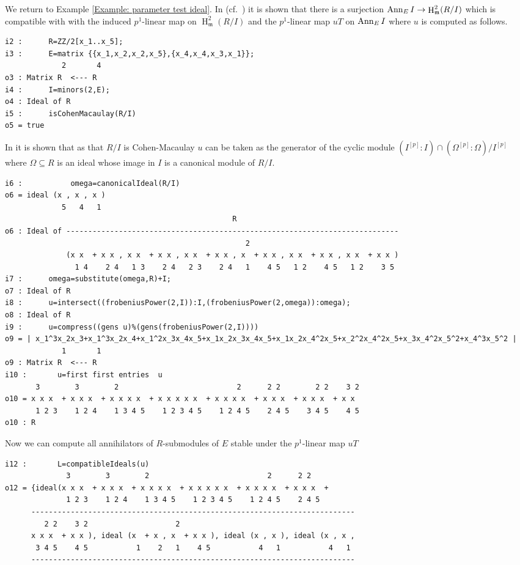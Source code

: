 \documentclass[11pt]{amsart}
\DeclareMathOperator{\HH}{H}
\begin{document}
\begin{example}
 
We return to Example \ref{Example: parameter test ideal}.
In (cf.~\cite[\S 9]{KatzmanParameterTestIdealOfCMRings}) it is shown that
there is a surjection $\Ann_E I \rightarrow \HH^2_{\mathfrak{m}} (R/I)$
which is compatible with with the induced $p^1$-linear map on $\HH^2_{\mathfrak{m}} (R/I)$
and the $p^1$-linear map $u T$ on $\operatorname{{Ann}}_E I$ where $u$ is computed as follows.
\begin{verbatim}
i2 :      R=ZZ/2[x_1..x_5]; 
i3 :      E=matrix {{x_1,x_2,x_2,x_5},{x_4,x_4,x_3,x_1}};
             2       4
o3 : Matrix R  <--- R
i4 :      I=minors(2,E);
o4 : Ideal of R
i5 :      isCohenMacaulay(R/I)
o5 = true
\end{verbatim}

In \cite{KatzmanParameterTestIdealOfCMRings} it is shown that as that $R/I$ is Cohen-Macaulay $u$
can be taken as the generator of the cyclic module $(I^{[p]}:I) \cap (\Omega^{[p]}:\Omega)/I^{[p]}$
where $\Omega \subseteq R$ is an ideal whose image in $I$ is a canonical module of $R/I$.


\begin{verbatim}
i6 :           omega=canonicalIdeal(R/I)
o6 = ideal (x , x , x )
             5   4   1
                                                    R
o6 : Ideal of ----------------------------------------------------------------------------
                                                       2
              (x x  + x x , x x  + x x , x x  + x x , x  + x x , x x  + x x , x x  + x x )
                1 4    2 4   1 3    2 4   2 3    2 4   1    4 5   1 2    4 5   1 2    3 5
i7 :      omega=substitute(omega,R)+I;
o7 : Ideal of R
i8 :      u=intersect((frobeniusPower(2,I)):I,(frobeniusPower(2,omega)):omega);
o8 : Ideal of R
i9 :      u=compress((gens u)%(gens(frobeniusPower(2,I))))
o9 = | x_1^3x_2x_3+x_1^3x_2x_4+x_1^2x_3x_4x_5+x_1x_2x_3x_4x_5+x_1x_2x_4^2x_5+x_2^2x_4^2x_5+x_3x_4^2x_5^2+x_4^3x_5^2 |
             1       1
o9 : Matrix R  <--- R
i10 :       u=first first entries  u
       3        3        2                           2      2 2        2 2    3 2
o10 = x x x  + x x x  + x x x x  + x x x x x  + x x x x  + x x x  + x x x  + x x
       1 2 3    1 2 4    1 3 4 5    1 2 3 4 5    1 2 4 5    2 4 5    3 4 5    4 5
o10 : R
\end{verbatim}
Now we can compute all annihilators of $R$-submodules of $E$ stable under the $p^1$-linear map $uT$
\begin{verbatim}
i12 :       L=compatibleIdeals(u)
              3        3        2                           2      2 2    
o12 = {ideal(x x x  + x x x  + x x x x  + x x x x x  + x x x x  + x x x  +
              1 2 3    1 2 4    1 3 4 5    1 2 3 4 5    1 2 4 5    2 4 5  
      --------------------------------------------------------------------------
         2 2    3 2                    2                                        
      x x x  + x x ), ideal (x  + x , x  + x x ), ideal (x , x ), ideal (x , x ,
       3 4 5    4 5           1    2   1    4 5           4   1           4   1 
      --------------------------------------------------------------------------
                                                                             

\end{verbatim}
\end{example}
\end{document}
